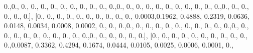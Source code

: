 \documentclass[
]{book}
\newenvironment{Shaded}{\begin{snugshade}}{\end{snugshade}}
\newcommand{\FloatTok}[1]{\textcolor[rgb]{0.00,0.00,0.81}{#1}}
\newcommand{\NormalTok}[1]{#1}
\begin{document}
\begin{Shaded}
\begin{Highlighting}[]
\FloatTok{0.}\NormalTok{,}\FloatTok{0.}\NormalTok{, }\FloatTok{0.}\NormalTok{, }\FloatTok{0.}\NormalTok{, }\FloatTok{0.}\NormalTok{, }\FloatTok{0.}\NormalTok{, }\FloatTok{0.}\NormalTok{, }\FloatTok{0.}\NormalTok{, }\FloatTok{0.}\NormalTok{, }\FloatTok{0.}\NormalTok{, }\FloatTok{0.}\NormalTok{, }\FloatTok{0.}\NormalTok{,}\FloatTok{0.}\NormalTok{, }\FloatTok{0.}\NormalTok{, }\FloatTok{0.}\NormalTok{, }\FloatTok{0.}\NormalTok{, }\FloatTok{0.}\NormalTok{, }\FloatTok{0.}\NormalTok{, }\FloatTok{0.}\NormalTok{, }\FloatTok{0.}\NormalTok{,}
\FloatTok{0.}\NormalTok{, }\FloatTok{0.}\NormalTok{, }\FloatTok{0.}\NormalTok{,}\FloatTok{0.}\NormalTok{, }\FloatTok{0.}\NormalTok{, }\FloatTok{0.}\NormalTok{, }\FloatTok{0.}\NormalTok{, }\FloatTok{0.}\NormalTok{, }\FloatTok{0.}\NormalTok{], [}\FloatTok{0.}\NormalTok{, }\FloatTok{0.}\NormalTok{, }\FloatTok{0.}\NormalTok{, }\FloatTok{0.}\NormalTok{, }\FloatTok{0.}\NormalTok{, }\FloatTok{0.}\NormalTok{, }\FloatTok{0.}\NormalTok{, }\FloatTok{0.}\NormalTok{, }\FloatTok{0.}\NormalTok{, }\FloatTok{0.}\NormalTok{,}
\FloatTok{0.0003}\NormalTok{,}\FloatTok{0.1962}\NormalTok{, }\FloatTok{0.4888}\NormalTok{, }\FloatTok{0.2319}\NormalTok{, }\FloatTok{0.0636}\NormalTok{, }\FloatTok{0.0148}\NormalTok{, }\FloatTok{0.0034}\NormalTok{, }\FloatTok{0.0008}\NormalTok{, }\FloatTok{0.0002}\NormalTok{, }\FloatTok{0.}\NormalTok{, }\FloatTok{0.}\NormalTok{,}
\FloatTok{0.}\NormalTok{,}\FloatTok{0.}\NormalTok{, }\FloatTok{0.}\NormalTok{, }\FloatTok{0.}\NormalTok{, }\FloatTok{0.}\NormalTok{, }\FloatTok{0.}\NormalTok{, }\FloatTok{0.}\NormalTok{, }\FloatTok{0.}\NormalTok{, }\FloatTok{0.}\NormalTok{, }\FloatTok{0.}\NormalTok{, }\FloatTok{0.}\NormalTok{, }\FloatTok{0.}\NormalTok{,}\FloatTok{0.}\NormalTok{, }\FloatTok{0.}\NormalTok{, }\FloatTok{0.}\NormalTok{, }\FloatTok{0.}\NormalTok{, }\FloatTok{0.}\NormalTok{, }\FloatTok{0.}\NormalTok{, }\FloatTok{0.}\NormalTok{, }\FloatTok{0.}\NormalTok{,}
\FloatTok{0.}\NormalTok{, }\FloatTok{0.}\NormalTok{, }\FloatTok{0.}\NormalTok{,}\FloatTok{0.}\NormalTok{, }\FloatTok{0.}\NormalTok{, }\FloatTok{0.}\NormalTok{, }\FloatTok{0.}\NormalTok{, }\FloatTok{0.}\NormalTok{, }\FloatTok{0.}\NormalTok{], [}\FloatTok{0.}\NormalTok{, }\FloatTok{0.}\NormalTok{, }\FloatTok{0.}\NormalTok{, }\FloatTok{0.}\NormalTok{, }\FloatTok{0.}\NormalTok{, }\FloatTok{0.}\NormalTok{, }\FloatTok{0.}\NormalTok{, }\FloatTok{0.}\NormalTok{, }\FloatTok{0.}\NormalTok{, }\FloatTok{0.}\NormalTok{,}
\FloatTok{0.}\NormalTok{,}\FloatTok{0.0087}\NormalTok{, }\FloatTok{0.3362}\NormalTok{, }\FloatTok{0.4294}\NormalTok{, }\FloatTok{0.1674}\NormalTok{, }\FloatTok{0.0444}\NormalTok{, }\FloatTok{0.0105}\NormalTok{, }\FloatTok{0.0025}\NormalTok{, }\FloatTok{0.0006}\NormalTok{, }\FloatTok{0.0001}\NormalTok{, }\FloatTok{0.}\NormalTok{,}

\end{Highlighting}
\end{Shaded}
\end{document}
